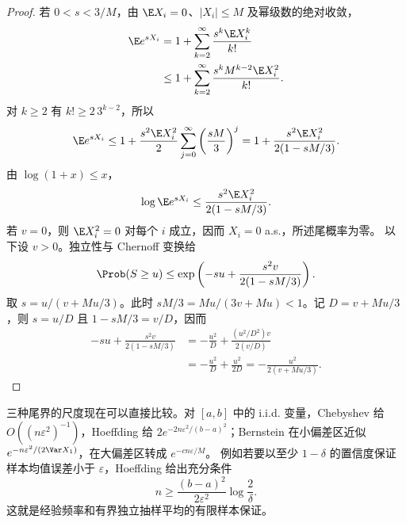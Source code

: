 \begin{proof}
若 $0<s<3/M$，由 $\E X_i=0$、$|X_i|\leq M$ 及幂级数的绝对收敛，
\begin{align*}
 \E e^{sX_i}
 &=1+\sum_{k=2}^{\infty}\frac{s^k\E X_i^k}{k!}\\
 &\leq1+\sum_{k=2}^{\infty}
       \frac{s^kM^{k-2}\E X_i^2}{k!}.
\end{align*}
对 $k\geq2$ 有 $k!\geq2\,3^{k-2}$，所以
\[
 \E e^{sX_i}
 \leq1+\frac{s^2\E X_i^2}{2}
        \sum_{j=0}^{\infty}\left(\frac{sM}{3}\right)^j
 =1+\frac{s^2\E X_i^2}{2(1-sM/3)}.
\]
由 $\log(1+x)\leq x$，
\[
 \log\E e^{sX_i}
 \leq\frac{s^2\E X_i^2}{2(1-sM/3)}.
\]
若 $v=0$，则 $\E X_i^2=0$ 对每个 $i$ 成立，因而 $X_i=0$ a.s.，所述尾概率为零。
以下设 $v>0$。独立性与 Chernoff
变换给
\[
 \Prob(S\geq u)
 \leq\exp\left(-su+\frac{s^2v}{2(1-sM/3)}\right).
\]
取
$s=u/(v+Mu/3)$。此时 $sM/3=Mu/(3v+Mu)<1$。记 $D=v+Mu/3$，则
$s=u/D$ 且 $1-sM/3=v/D$，因而
\begin{align*}
 -su+\frac{s^2v}{2(1-sM/3)}
 &=-\frac{u^2}{D}
   +\frac{(u^2/D^2)v}{2(v/D)}\\
 &=-\frac{u^2}{D}+\frac{u^2}{2D}
 =-\frac{u^2}{2(v+Mu/3)}.
\end{align*}
\end{proof}

三种尾界的尺度现在可以直接比较。对 $[a,b]$ 中的 i.i.d. 变量，Chebyshev 给
$O((n\varepsilon^2)^{-1})$，Hoeffding 给
$2e^{-2n\varepsilon^2/(b-a)^2}$；Bernstein 在小偏差区近似
$e^{-n\varepsilon^2/(2\Var X_1)}$，在大偏差区转成 $e^{-cn\varepsilon/M}$。
例如若要以至少 $1-\delta$ 的置信度保证样本均值误差小于 $\varepsilon$，Hoeffding 给出充分条件
\[
 n\geq\frac{(b-a)^2}{2\varepsilon^2}\log\frac2\delta.
\]
这就是经验频率和有界独立抽样平均的有限样本保证。

\begin{center}
\end{center}

